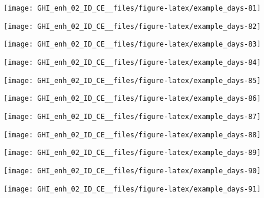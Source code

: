 \documentclass[
  10pt,
  a4paper,oneside]{article}
\begin{document}
\begin{center}\texttt{[image: GHI\_enh\_02\_ID\_CE\_\_files/figure-latex/example\_days-81]} \end{center}

\begin{center}\texttt{[image: GHI\_enh\_02\_ID\_CE\_\_files/figure-latex/example\_days-82]} \end{center}

\begin{center}\texttt{[image: GHI\_enh\_02\_ID\_CE\_\_files/figure-latex/example\_days-83]} \end{center}

\begin{center}\texttt{[image: GHI\_enh\_02\_ID\_CE\_\_files/figure-latex/example\_days-84]} \end{center}

\begin{center}\texttt{[image: GHI\_enh\_02\_ID\_CE\_\_files/figure-latex/example\_days-85]} \end{center}

\begin{center}\texttt{[image: GHI\_enh\_02\_ID\_CE\_\_files/figure-latex/example\_days-86]} \end{center}

\begin{center}\texttt{[image: GHI\_enh\_02\_ID\_CE\_\_files/figure-latex/example\_days-87]} \end{center}

\begin{center}\texttt{[image: GHI\_enh\_02\_ID\_CE\_\_files/figure-latex/example\_days-88]} \end{center}

\begin{center}\texttt{[image: GHI\_enh\_02\_ID\_CE\_\_files/figure-latex/example\_days-89]} \end{center}

\begin{center}\texttt{[image: GHI\_enh\_02\_ID\_CE\_\_files/figure-latex/example\_days-90]} \end{center}

\begin{center}\texttt{[image: GHI\_enh\_02\_ID\_CE\_\_files/figure-latex/example\_days-91]} \end{center}
\end{document}
